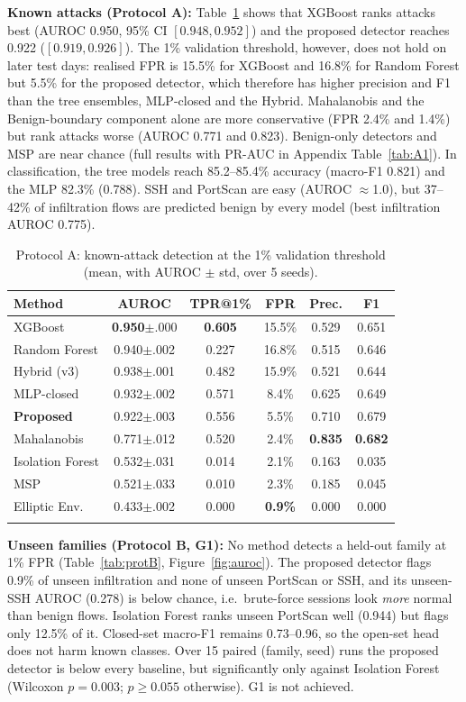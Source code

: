 \documentclass[pdflatex,sn-mathphys-num,iicol]{sn-jnl}%
\begin{document}
\textbf{Known attacks (Protocol A):} Table~\ref{tab:protA} shows that XGBoost ranks attacks best (AUROC 0.950, 95\% CI $[0.948,0.952]$) and the proposed detector reaches 0.922 ($[0.919,0.926]$). The 1\% validation threshold, however, does not hold on later test days: realised FPR is 15.5\% for XGBoost and 16.8\% for Random Forest but 5.5\% for the proposed detector, which therefore has higher precision and F1 than the tree ensembles, MLP-closed and the Hybrid. Mahalanobis and the Benign-boundary component alone are more conservative (FPR 2.4\% and 1.4\%) but rank attacks worse (AUROC 0.771 and 0.823). Benign-only detectors and MSP are near chance (full results with PR-AUC in Appendix Table~\ref{tab:A1}). In classification, the tree models reach 85.2--85.4\% accuracy (macro-F1 0.821) and the MLP 82.3\% (0.788). SSH and PortScan are easy (AUROC $\approx$1.0), but 37--42\% of infiltration flows are predicted benign by every model (best infiltration AUROC 0.775).

\begin{table}[t]
\caption{Protocol A: known-attack detection at the 1\% validation threshold (mean, with AUROC $\pm$ std, over 5 seeds).}\label{tab:protA}
\footnotesize
\setlength{\tabcolsep}{2pt}
\begin{tabular}{@{}lccccc@{}}
\toprule
Method & AUROC & TPR@1\% & FPR & Prec. & F1 \\
\midrule
XGBoost & \textbf{0.950}$\pm$.000 & \textbf{0.605} & 15.5\% & 0.529 & 0.651 \\
Random Forest & 0.940$\pm$.002 & 0.227 & 16.8\% & 0.515 & 0.646 \\
Hybrid (v3) & 0.938$\pm$.001 & 0.482 & 15.9\% & 0.521 & 0.644 \\
MLP-closed & 0.932$\pm$.002 & 0.571 & 8.4\% & 0.625 & 0.649 \\
\textbf{Proposed} & 0.922$\pm$.003 & 0.556 & 5.5\% & 0.710 & 0.679 \\
Mahalanobis & 0.771$\pm$.012 & 0.520 & 2.4\% & \textbf{0.835} & \textbf{0.682} \\
Isolation Forest & 0.532$\pm$.031 & 0.014 & 2.1\% & 0.163 & 0.035 \\
MSP & 0.521$\pm$.033 & 0.010 & 2.3\% & 0.185 & 0.045 \\
Elliptic Env. & 0.433$\pm$.002 & 0.000 & \textbf{0.9\%} & 0.000 & 0.000 \\
\botrule
\end{tabular}
\end{table}

\textbf{Unseen families (Protocol B, G1):} No method detects a held-out family at 1\% FPR (Table~\ref{tab:protB}, Figure~\ref{fig:auroc}). The proposed detector flags 0.9\% of unseen infiltration and none of unseen PortScan or SSH, and its unseen-SSH AUROC (0.278) is below chance, i.e.\ brute-force sessions look \emph{more} normal than benign flows. Isolation Forest ranks unseen PortScan well (0.944) but flags only 12.5\% of it. Closed-set macro-F1 remains 0.73--0.96, so the open-set head does not harm known classes. Over 15 paired (family, seed) runs the proposed detector is below every baseline, but significantly only against Isolation Forest (Wilcoxon $p=0.003$; $p\ge0.055$ otherwise). G1 is not achieved.
\end{document}
